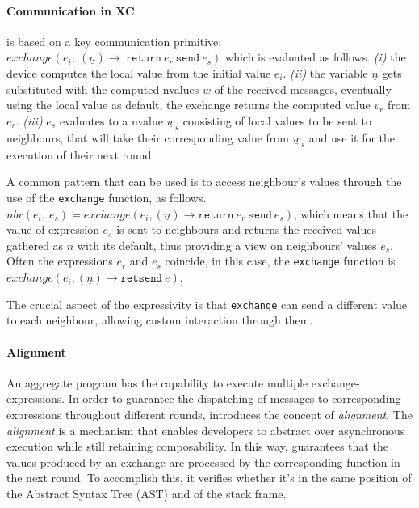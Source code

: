 \paragraph{Communication in XC}
\label{par:communication-in-xc}

\xc{} is based on a key communication primitive:\\ $exchange(e_i,\ (\underline{n}) \rightarrow \ \texttt{return} \ e_r \ \texttt{send} \ e_s)$
which is evaluated as follows.
    \emph{(i)} the device computes the local value from the initial value $e_i$.
    \emph{(ii)} the variable $\underline{n}$ gets substituted with the computed nvalues $\underline{w}$ of the received messages, eventually
        using the local value as default, the exchange returns the computed value $v_r$ from $e_r$.
    \emph{(iii)} $e_s$ evaluates to a nvalue $\underline{w}_s$ consisting of local values to be sent to neighbours,
        that will take their corresponding value from $\underline{w}_s$ and use it for the execution of their next round.

A common pattern that can be used is to access neighbour's values through the use of the \texttt{exchange} function, as follows.\\
$nbr(e_i,\ e_s) = exchange(e_i, (\underline{n}) \rightarrow \texttt{return} \ e_r \ \texttt{send} \ e_s)$,
which means that the value of expression $e_s$ is sent to neighbours and returns the received values gathered as
$\underline{n}$ with its default, thus providing a view on neighbours' values $e_s$.
Often the expressions $e_r$ and $e_s$ coincide, in this case, the \texttt{exchange} function is
$exchange(e_i, (\underline{n}) \rightarrow \texttt{retsend} \ e)$.

The crucial aspect of the \xc{} expressivity is that \texttt{exchange} can send a different value to each neighbour,
allowing custom interaction through them.

\paragraph{Alignment}
An aggregate program has the capability to execute multiple exchange-expressions.
In order to guarantee the dispatching of messages to corresponding expressions throughout different rounds,
    \xc{} introduces the concept of \emph{alignment}.
The \emph{alignment} is a mechanism that enables developers to abstract over asynchronous execution while still retaining
composability.
In this way, \xc{} guarantees that the values produced by an exchange are processed by the corresponding function
in the next round.
To accomplish this, it verifies whether it's in the same position of the Abstract Syntax Tree (AST) and of the stack frame.

